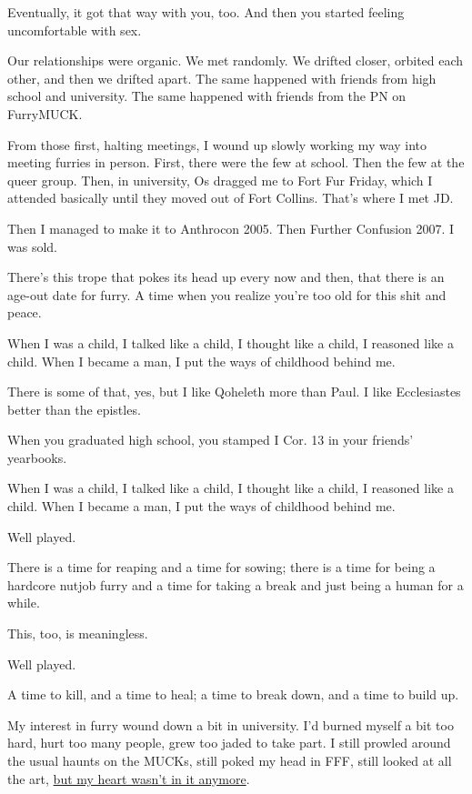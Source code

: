 \begin{leftcolumn}
\begin{ally}
Eventually, it got that way with you, too. And then you started feeling uncomfortable with sex.
\end{ally}
Our relationships were organic. We met randomly. We drifted closer, orbited each other, and then we drifted apart. The same happened with friends from high school and university. The same happened with friends from the PN on FurryMUCK.

From those first, halting meetings, I wound up slowly working my way into meeting furries in person. First, there were the few at school. Then the few at the queer group. Then, in university, Os dragged me to Fort Fur Friday, which I attended basically until they moved out of Fort Collins. That's where I met JD.

Then I managed to make it to Anthrocon 2005. Then Further Confusion 2007. I was sold.

There's this trope that pokes its head up every now and then, that there is an age-out date for furry. A time when you realize you're too old for this shit and peace.

\begin{ally}
When I was a child, I talked like a child, I thought like a child, I reasoned like a child. When I became a man, I put the ways of childhood behind me.
\end{ally}
There is some of that, yes, but I like Qoheleth more than Paul. I like Ecclesiastes better than the epistles.

\begin{ally}
When you graduated high school, you stamped I Cor. 13 in your friends' yearbooks.
\end{ally}
When I was a child, I talked like a child, I thought like a child, I reasoned like a child. When I became a man, I put the ways of childhood behind me.

\begin{ally}
Well played.
\end{ally}
There is a time for reaping and a time for sowing; there is a time for being a hardcore nutjob furry and a time for taking a break and just being a human for a while.

\begin{ally}
This, too, is meaningless.
\end{ally}
Well played.
\newpage

A time to kill, and a time to heal; a time to break down, and a time to build up.

My interest in furry wound down a bit in university. I'd burned myself a bit too hard, hurt too many people, grew too jaded to take part. I still prowled around the usual haunts on the MUCKs, still poked my head in FFF, still looked at all the art, \href{https://adjectivespecies.com/2012/03/21/makyos-kaddish/}{but my heart wasn't in it anymore}.


\end{leftcolumn}
